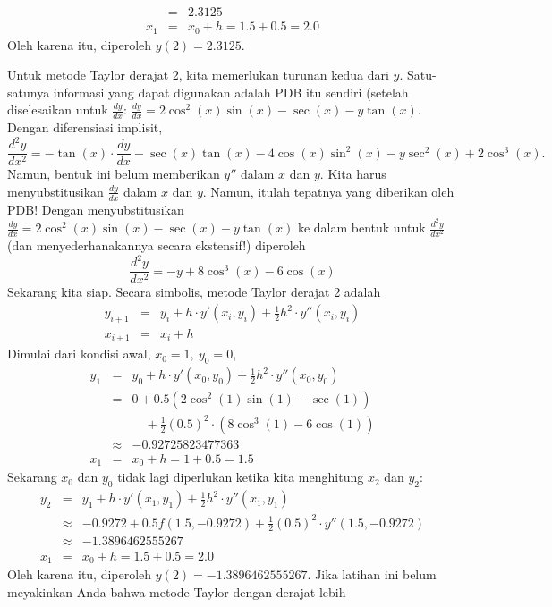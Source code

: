 \begin{description}
\begin{eqnarray*}
 & = & 2.3125\\
x_{1} & = & x_{0}+h=1.5+0.5=2.0
\end{eqnarray*}
Oleh karena itu, diperoleh $y(2)=2.3125$.
\item [{\ref{exc:ode-taylor-9}d:}] Untuk metode Taylor derajat 2, kita
memerlukan turunan kedua dari $y$. Satu-satunya informasi yang dapat
digunakan adalah PDB itu sendiri (setelah diselesaikan untuk $\frac{dy}{dx}$:
$\frac{dy}{dx}=2\cos^{2}(x)\sin(x)-\sec(x)-y\tan(x)$. Dengan diferensiasi
implisit,
\[
\frac{d^{2}y}{dx^{2}}=-\tan(x)\cdot\frac{dy}{dx}-\sec(x)\tan(x)-4\cos(x)\sin^{2}(x)-y\sec^{2}(x)+2\cos^{3}(x).
\]
Namun, bentuk ini belum memberikan $y''$ dalam $x$ dan $y$. Kita
harus menyubstitusikan $\frac{dy}{dx}$ dalam $x$ dan $y$. Namun,
itulah tepatnya yang diberikan oleh PDB! Dengan menyubstitusikan $\frac{dy}{dx}=2\cos^{2}(x)\sin(x)-\sec(x)-y\tan(x)$
ke dalam bentuk untuk $\frac{d^{2}y}{dx^{2}}$ (dan menyederhanakannya
secara ekstensif!) diperoleh
\[
\frac{d^{2}y}{dx^{2}}=-y+8\cos^{3}(x)-6\cos(x)
\]
Sekarang kita siap. Secara simbolis, metode Taylor derajat 2 adalah
\begin{eqnarray*}
y_{i+1} & = & y_{i}+h\cdot y'(x_{i},y_{i})+\frac{1}{2}h^{2}\cdot y''(x_{i},y_{i})\\
x_{i+1} & = & x_{i}+h
\end{eqnarray*}
Dimulai dari kondisi awal, $x_{0}=1,\ y_{0}=0$,
\begin{eqnarray*}
y_{1} & = & y_{0}+h\cdot y'(x_{0},y_{0})+\frac{1}{2}h^{2}\cdot y''(x_{0},y_{0})\\
 & = & 0+0.5(2\cos^{2}(1)\sin(1)-\sec(1))\\
 &  & \quad+\frac{1}{2}(0.5)^{2}\cdot(8\cos^{3}(1)-6\cos(1))\\
 & \approx & -0.92725823477363\\
x_{1} & = & x_{0}+h=1+0.5=1.5
\end{eqnarray*}
Sekarang $x_{0}$ dan $y_{0}$ tidak lagi diperlukan ketika kita menghitung
$x_{2}$ dan $y_{2}$:
\begin{eqnarray*}
y_{2} & = & y_{1}+h\cdot y'(x_{1},y_{1})+\frac{1}{2}h^{2}\cdot y''(x_{1},y_{1})\\
 & \approx & -0.9272+0.5f(1.5,-0.9272)+\frac{1}{2}(0.5)^{2}\cdot y''(1.5,-0.9272)\\
 & \approx & -1.3896462555267\\
x_{1} & = & x_{0}+h=1.5+0.5=2.0
\end{eqnarray*}
Oleh karena itu, diperoleh $y(2)=-1.3896462555267$. Jika latihan
ini belum meyakinkan Anda bahwa metode Taylor dengan derajat lebih

\end{description}
